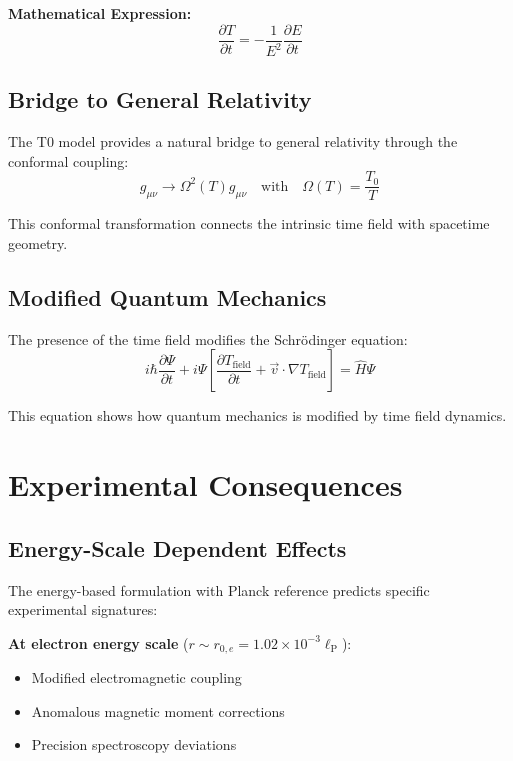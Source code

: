 \documentclass[12pt,a4paper]{report}
\newcommand{\lP}{\ell_{\text{P}}}         %
\begin{document}
	\textbf{Mathematical Expression:}
	\begin{equation}
		\frac{\partial T}{\partial t} = -\frac{1}{E^2}\frac{\partial E}{\partial t}
	\end{equation}
	
	\subsection{Bridge to General Relativity}\label{subsec:bridge_general_relativity}
	
	The T0 model provides a natural bridge to general relativity through the conformal coupling:
	\begin{equation}
		g_{\mu\nu} \to \Omega^2(T) g_{\mu\nu} \quad \text{with} \quad \Omega(T) = \frac{T_0}{T}
		\label{eq:conformal_coupling}
	\end{equation}
	
	This conformal transformation connects the intrinsic time field with spacetime geometry.
	
	\subsection{Modified Quantum Mechanics}\label{subsec:modified_quantum_mechanics}
	
	The presence of the time field modifies the Schrödinger equation:
	\begin{equation}
		i \hbar \frac{\partial\Psi}{\partial t} + i\Psi\left[\frac{\partial T_{\text{field}}}{\partial t} + \vec{v} \cdot \nabla T_{\text{field}}\right] = \hat{H}\Psi
		\label{eq:modified_schrodinger}
	\end{equation}
	
	This equation shows how quantum mechanics is modified by time field dynamics.
	
	\section{Experimental Consequences}\label{sec:experimental_consequences}
	
	\subsection{Energy-Scale Dependent Effects}\label{subsec:energy_scale_effects}
	
	The energy-based formulation with Planck reference predicts specific experimental signatures:
	
	\textbf{At electron energy scale} ($r \sim r_{0,e} = 1.02 \times 10^{-3} \lP$):
	\begin{itemize}
		\item Modified electromagnetic coupling
		\item Anomalous magnetic moment corrections
		\item Precision spectroscopy deviations
	\end{itemize}
	
\end{document}
